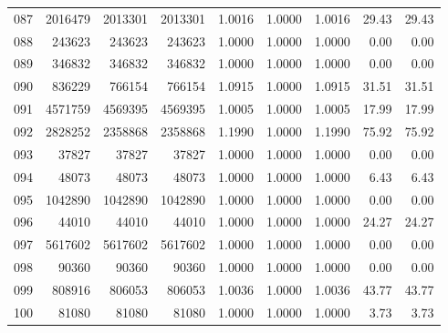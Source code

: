 \begin{longtable}{crrrrrrrr}
087 & 2016479 & 2013301 & 2013301 & 1.0016 & 1.0000 & 1.0016 & 29.43 & 29.43 \\
088 & 243623 & 243623 & 243623 & 1.0000 & 1.0000 & 1.0000 & 0.00 & 0.00 \\
089 & 346832 & 346832 & 346832 & 1.0000 & 1.0000 & 1.0000 & 0.00 & 0.00 \\
090 & 836229 & 766154 & 766154 & 1.0915 & 1.0000 & 1.0915 & 31.51 & 31.51 \\
091 & 4571759 & 4569395 & 4569395 & 1.0005 & 1.0000 & 1.0005 & 17.99 & 17.99 \\
092 & 2828252 & 2358868 & 2358868 & 1.1990 & 1.0000 & 1.1990 & 75.92 & 75.92 \\
093 & 37827 & 37827 & 37827 & 1.0000 & 1.0000 & 1.0000 & 0.00 & 0.00 \\
094 & 48073 & 48073 & 48073 & 1.0000 & 1.0000 & 1.0000 & 6.43 & 6.43 \\
095 & 1042890 & 1042890 & 1042890 & 1.0000 & 1.0000 & 1.0000 & 0.00 & 0.00 \\
096 & 44010 & 44010 & 44010 & 1.0000 & 1.0000 & 1.0000 & 24.27 & 24.27 \\
097 & 5617602 & 5617602 & 5617602 & 1.0000 & 1.0000 & 1.0000 & 0.00 & 0.00 \\
098 & 90360 & 90360 & 90360 & 1.0000 & 1.0000 & 1.0000 & 0.00 & 0.00 \\
099 & 808916 & 806053 & 806053 & 1.0036 & 1.0000 & 1.0036 & 43.77 & 43.77 \\
100 & 81080 & 81080 & 81080 & 1.0000 & 1.0000 & 1.0000 & 3.73 & 3.73 \\
\end{longtable}

